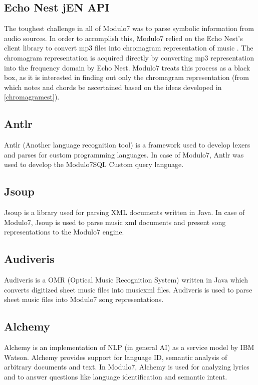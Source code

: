 \subsection{Echo Nest jEN API} \label{echonestjen}

\noindent The toughest challenge in all of Modulo7 was to parse symbolic information from audio sources. In order to accomplish this, Modulo7 relied on the Echo Nest's client library to convert mp3 files into chromagram representation of music \cite{chromagramtutorial}. The chromagram representation is acquired directly by converting mp3 representation into the frequency domain by Echo Nest. Modulo7 treats this process as a black box, as it is interested in finding out only the chromagram representation (from which notes and chords be ascertained based on the ideas developed in \ref{chromagramest}). 

\subsection{Antlr} \label{antlr}

\noindent Antlr (Another language recognition tool) is a framework used to develop lexers and parses for custom programming languages. In case of Modulo7, Antlr was used to develop the Modulo7SQL Custom query language.

\subsection{Jsoup}

\noindent Jsoup is a library used for parsing XML documents written in Java. In case of Modulo7, Jsoup is used to parse music xml documents and present song representations to the Modulo7 engine. 

\subsection{Audiveris}

\noindent Audiveris is a OMR (Optical Music Recognition System) written in Java which converts digitized sheet music files into musicxml files. Audiveris is used to parse sheet music files into Modulo7 song representations.

\subsection{Alchemy} \label{Alchemy}

\noindent Alchemy is an implementation of NLP (in general AI) as a service model by IBM Watson. Alchemy provides support for language ID, semantic analysis of arbitrary documents and text. In Modulo7, Alchemy is used for analyzing lyrics and to answer questions like language identification and semantic intent. 

